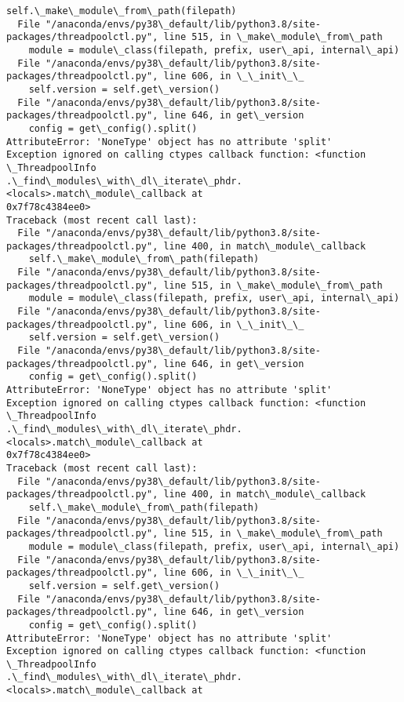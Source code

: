 \documentclass[11pt]{article}
\begin{document}
\begin{Verbatim}[commandchars=\\\{\}]
    self.\_make\_module\_from\_path(filepath)
  File "/anaconda/envs/py38\_default/lib/python3.8/site-
packages/threadpoolctl.py", line 515, in \_make\_module\_from\_path
    module = module\_class(filepath, prefix, user\_api, internal\_api)
  File "/anaconda/envs/py38\_default/lib/python3.8/site-
packages/threadpoolctl.py", line 606, in \_\_init\_\_
    self.version = self.get\_version()
  File "/anaconda/envs/py38\_default/lib/python3.8/site-
packages/threadpoolctl.py", line 646, in get\_version
    config = get\_config().split()
AttributeError: 'NoneType' object has no attribute 'split'
Exception ignored on calling ctypes callback function: <function \_ThreadpoolInfo
.\_find\_modules\_with\_dl\_iterate\_phdr.<locals>.match\_module\_callback at
0x7f78c4384ee0>
Traceback (most recent call last):
  File "/anaconda/envs/py38\_default/lib/python3.8/site-
packages/threadpoolctl.py", line 400, in match\_module\_callback
    self.\_make\_module\_from\_path(filepath)
  File "/anaconda/envs/py38\_default/lib/python3.8/site-
packages/threadpoolctl.py", line 515, in \_make\_module\_from\_path
    module = module\_class(filepath, prefix, user\_api, internal\_api)
  File "/anaconda/envs/py38\_default/lib/python3.8/site-
packages/threadpoolctl.py", line 606, in \_\_init\_\_
    self.version = self.get\_version()
  File "/anaconda/envs/py38\_default/lib/python3.8/site-
packages/threadpoolctl.py", line 646, in get\_version
    config = get\_config().split()
AttributeError: 'NoneType' object has no attribute 'split'
Exception ignored on calling ctypes callback function: <function \_ThreadpoolInfo
.\_find\_modules\_with\_dl\_iterate\_phdr.<locals>.match\_module\_callback at
0x7f78c4384ee0>
Traceback (most recent call last):
  File "/anaconda/envs/py38\_default/lib/python3.8/site-
packages/threadpoolctl.py", line 400, in match\_module\_callback
    self.\_make\_module\_from\_path(filepath)
  File "/anaconda/envs/py38\_default/lib/python3.8/site-
packages/threadpoolctl.py", line 515, in \_make\_module\_from\_path
    module = module\_class(filepath, prefix, user\_api, internal\_api)
  File "/anaconda/envs/py38\_default/lib/python3.8/site-
packages/threadpoolctl.py", line 606, in \_\_init\_\_
    self.version = self.get\_version()
  File "/anaconda/envs/py38\_default/lib/python3.8/site-
packages/threadpoolctl.py", line 646, in get\_version
    config = get\_config().split()
AttributeError: 'NoneType' object has no attribute 'split'
Exception ignored on calling ctypes callback function: <function \_ThreadpoolInfo
.\_find\_modules\_with\_dl\_iterate\_phdr.<locals>.match\_module\_callback at

\end{Verbatim}
\end{document}
